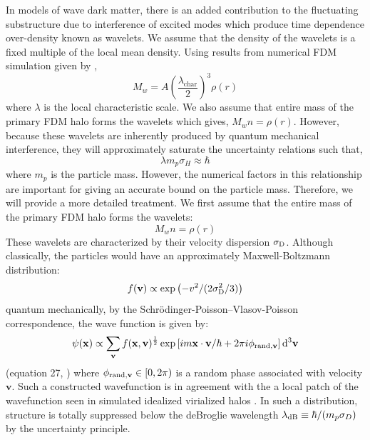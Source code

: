 \documentclass[usenatbib]{mnras}
\begin{document}
In models of wave dark matter, there is an added contribution to the fluctuating substructure due to interference of excited modes which produce time dependence over-density known as wavelets. We assume that the density of the wavelets is a fixed multiple of the local mean density. Using results from numerical FDM simulation given by \cite{BECDM},
\begin{equation} \label{mutiple_of_background}
M_w = A \left(\frac{\lambda_{\text{char}}}{2} \right)^3 \rho(r) 
\end{equation}  
where $\lambda$ is the local characteristic scale. We also assume that entire mass of the primary FDM halo forms the wavelets which gives, $M_w n = \rho(r)$. However, because these wavelets are inherently produced by quantum mechanical interference, they will approximately saturate the uncertainty relations such that,
\begin{equation}
\lambda m_p \sigma_H \approx \hbar
\end{equation}
where $m_p$ is the particle mass. However, the numerical factors in this relationship are important for giving an accurate bound on the particle mass. Therefore, we will provide a more detailed treatment. We first assume that the entire mass of the primary FDM halo forms the wavelets:
\begin{equation} \label{const}
M_w n = \rho(r)
\end{equation}
These wavelets are characterized by their velocity dispersion 
$\sigma_{\rm D}$.
Although classically, the particles would have an approximately Maxwell-Boltzmann distribution:
\begin{equation}
f(\mathbf{v}) \propto \exp\left(-v^2/(2\sigma_{\rm D}^2/3)\right)
\end{equation}
quantum mechanically, by the Schr\"{o}dinger-Poisson–Vlasov-Poisson correspondence, the wave function is given by:
\begin{equation} \label{phase_dist}
\psi(\mathbf{x}) \propto \sum_{\mathbf{v}} f(\mathbf{x},\mathbf{v})^{\frac{1}{2}} \exp{\left[i m \mathbf{x}\cdot\mathbf{v}/\hbar + 2\pi i \phi_{{\rm rand},\mathbf{v}} \right]}
\, \mathrm{d}^{3}{\mathbf{v}}
\end{equation}
(equation 27, \cite{Schrodinger-Poisson}) where $\phi_{{\rm rand},\mathbf{v}}\in[0,2\pi)$ is a random phase associated with velocity $\mathbf{v}$.
Such a constructed wavefunction is in agreement with the a local patch of the wavefunction seen in simulated idealized virialized halos \citep{BECDM}.
In such a distribution, structure is totally suppressed below the deBroglie wavelength $\lambda_{\rm dB} \equiv \hbar/(m_p\sigma_D)$ by the uncertainty principle.
\end{document}
